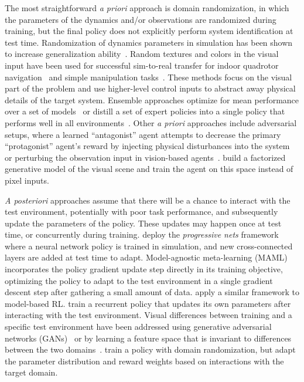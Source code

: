 \documentclass{article}
\newcommand{\TODO}[1]{\textcolor{red}{\textbf{TODO: #1}}}
\begin{document}
The most straightforward \emph{a priori} approach is domain randomization,
in which the parameters of the dynamics and/or observations are randomized during training,
but the final policy does not explicitly perform system identification at test time.
%
Randomization of dynamics parameters in simulation has been shown to increase generalization ability~\citep{antonova-pivoting-corr17, zhu-RL-IL-diverse}.
Random textures and colors in the visual input have been used for successful sim-to-real transfer
for indoor quadrotor navigation~\citep{sadeghi-cad2rl-rss17}
and simple manipulation tasks~\citep{tobin-domainrand-arxiv17,james-domain-xfer}.
These methods focus on the visual part of the problem and use higher-level control inputs
to abstract away physical details of the target system.
Ensemble approaches optimize for mean performance over a set of models~\citep{mordatch-ensemble-icra15}
or distill a set of expert policies into a single policy that performs well in all environments~\citep{actor-mimic,teh-distral}.
%
Other \emph{a priori} approaches include adversarial setups,
where a learned ``antagonist'' agent attempts to decrease the primary ``protagonist'' agent's reward
by injecting physical disturbances into the system~\citep{pinto-robust-adversarial-RL}
or perturbing the observation input in vision-based agents~\citep{huang-adversarial-attacks}.
\citet{higgins-DARLA} build a factorized generative model of the visual scene
and train the agent on this space instead of pixel inputs.


\emph{A posteriori} approaches assume that there will be a chance to interact with the test environment,
potentially with poor task performance,
and subsequently update the parameters of the policy.
These updates may happen once at test time, or concurrently during training.
%
\citet{rusu-progressive-nets} deploy the \emph{progressive nets} framework
where a neural network policy is trained in simulation, and new cross-connected layers are added
at test time to adapt.
%
Model-agnostic meta-learning (MAML)~\citep{finn-maml-icml17} incorporates the policy gradient update step directly in its training objective,
optimizing the policy to adapt to the test environment in a single gradient descent step after gathering a small amount of data.
\citet{clavera-maml-model} apply a similar framework to model-based RL.
%
\citet{duan-rl2} train a recurrent policy that updates its own parameters after interacting with the test environment.
%
Visual differences between training and a specific test environment have been addressed
using generative adversarial networks (GANs)~\citep{bousmalis-domain-gan-cvpr17}
or by learning a feature space that is invariant to differences between the two domains~\citep{bousmalis-domainseparation-nips16}.
%
%
\citet{rajeswaran-epopt-corr16} train a policy with domain randomization, but
adapt the parameter distribution and reward weights based on interactions with the target domain.
\end{document}
